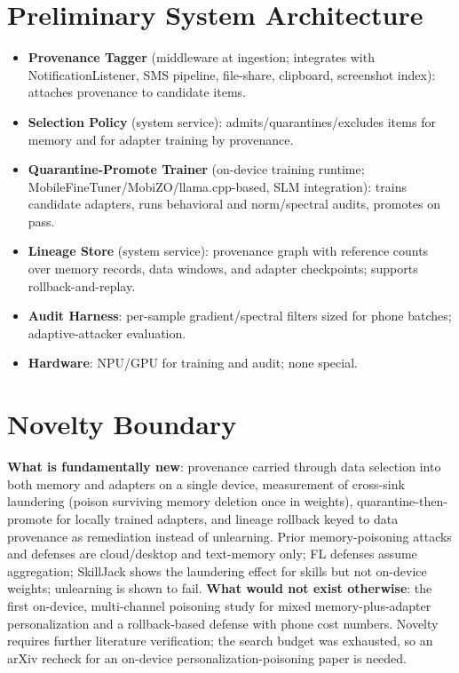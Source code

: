 \documentclass[11pt]{article}
\begin{document}
\section{Preliminary System Architecture}
\begin{itemize}
  \item \textbf{Provenance Tagger} (middleware at ingestion; integrates with NotificationListener, SMS pipeline, file-share, clipboard, screenshot index): attaches provenance to candidate items.
  \item \textbf{Selection Policy} (system service): admits/quarantines/excludes items for memory and for adapter training by provenance.
  \item \textbf{Quarantine-Promote Trainer} (on-device training runtime; MobileFineTuner/MobiZO/llama.cpp-based, SLM integration): trains candidate adapters, runs behavioral and norm/spectral audits, promotes on pass.
  \item \textbf{Lineage Store} (system service): provenance graph with reference counts over memory records, data windows, and adapter checkpoints; supports rollback-and-replay.
  \item \textbf{Audit Harness}: per-sample gradient/spectral filters sized for phone batches; adaptive-attacker evaluation.
  \item \textbf{Hardware}: NPU/GPU for training and audit; none special.
\end{itemize}

\section{Novelty Boundary}
\textbf{What is fundamentally new}: provenance carried through data selection into both memory and adapters on a single device, measurement of cross-sink laundering (poison surviving memory deletion once in weights), quarantine-then-promote for locally trained adapters, and lineage rollback keyed to data provenance as remediation instead of unlearning. Prior memory-poisoning attacks and defenses are cloud/desktop and text-memory only; FL defenses assume aggregation; SkillJack shows the laundering effect for skills but not on-device weights; unlearning is shown to fail. \textbf{What would not exist otherwise}: the first on-device, multi-channel poisoning study for mixed memory-plus-adapter personalization and a rollback-based defense with phone cost numbers. Novelty requires further literature verification; the search budget was exhausted, so an arXiv recheck for an on-device personalization-poisoning paper is needed.
\end{document}
